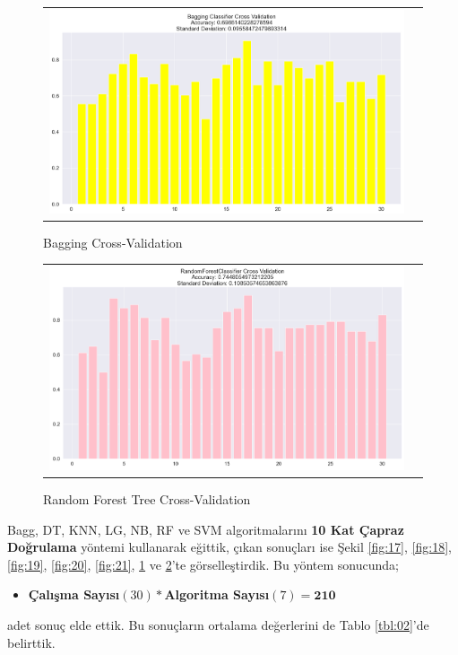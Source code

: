 \documentclass[conference]{IEEEtran}
\begin{document}
\begin{figure}[!h]
	\centering
	\begin{center}
		\begin{tabular}{cc}
			\includegraphics[scale=0.225]{pictures/pic_22.png}&
		\end{tabular}
	\end{center}
	\caption{Bagging Cross-Validation}
	\label{fig:22}
\end{figure}
\pagebreak
\begin{figure}[!h]
	\centering
	\begin{center}
		\begin{tabular}{cc}
			\includegraphics[scale=0.225]{pictures/pic_23.png}&
		\end{tabular}
	\end{center}
	\caption{Random Forest Tree Cross-Validation}
	\label{fig:23}
\end{figure}

\quad  Bagg, DT, KNN, LG, NB, RF ve SVM algoritmalarını \textbf{10 Kat Çapraz Doğrulama} yöntemi kullanarak eğittik, çıkan sonuçları ise Şekil \ref{fig:17}, \ref{fig:18}, \ref{fig:19}, \ref{fig:20}, \ref{fig:21}, \ref{fig:22} ve \ref{fig:23}'te görselleştirdik. Bu yöntem sonucunda;
\begin{itemize}
\item \textbf{Çalışma Sayısı}$(30) * $\textbf{Algoritma Sayısı}$(7) = \textbf{210}$
\end{itemize}
adet sonuç elde ettik. Bu sonuçların ortalama değerlerini de Tablo \ref{tbl:02}'de belirttik.
\end{document}
